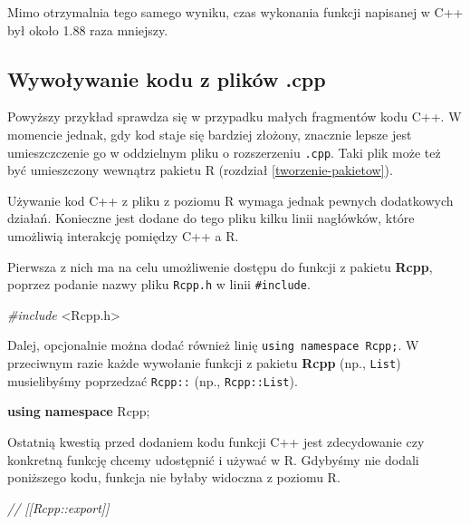 \documentclass[paper=6in:9in,pagesize=pdftex,headinclude=on,footinclude=on,10pt]{scrbook}
\newenvironment{Shaded}{\begin{snugshade}}{\end{snugshade}}
\newcommand{\CommentTok}[1]{\textcolor[rgb]{0.56,0.35,0.01}{\textit{#1}}}
\newcommand{\ImportTok}[1]{#1}
\newcommand{\KeywordTok}[1]{\textcolor[rgb]{0.13,0.29,0.53}{\textbf{#1}}}
\newcommand{\NormalTok}[1]{#1}
\newcommand{\PreprocessorTok}[1]{\textcolor[rgb]{0.56,0.35,0.01}{\textit{#1}}}
\begin{document}
Mimo otrzymalnia tego samego wyniku, czas wykonania funkcji napisanej w C++ był około 1.88 raza mniejszy.

\hypertarget{sourceCpp}{%
\subsection{Wywoływanie kodu z plików .cpp}\label{sourceCpp}}

Powyższy przykład sprawdza się w przypadku małych fragmentów kodu C++.
W momencie jednak, gdy kod staje się bardziej złożony, znacznie lepsze jest umieszczczenie go w oddzielnym pliku o rozszerzeniu \texttt{.cpp}.
Taki plik może też być umieszczony wewnątrz pakietu R (rozdział \ref{tworzenie-pakietow}).

Używanie kod C++ z pliku z poziomu R wymaga jednak pewnych dodatkowych działań.
Konieczne jest dodane do tego pliku kilku linii nagłówków, które umożliwią interakcję pomiędzy C++ a R.

Pierwsza z nich ma na celu umożliwenie dostępu do funkcji z pakietu \textbf{Rcpp}, poprzez podanie nazwy pliku \texttt{Rcpp.h} w linii \texttt{\#include}.

\begin{Shaded}
\begin{Highlighting}[]
\PreprocessorTok{#include }\ImportTok{<Rcpp.h>}
\end{Highlighting}
\end{Shaded}

Dalej, opcjonalnie można dodać również linię \texttt{using\ namespace\ Rcpp;}.
W przeciwnym razie każde wywołanie funkcji z pakietu \textbf{Rcpp} (np., \texttt{List}) musielibyśmy poprzedzać \texttt{Rcpp::} (np., \texttt{Rcpp::List}).

\begin{Shaded}
\begin{Highlighting}[]
\KeywordTok{using} \KeywordTok{namespace}\NormalTok{ Rcpp;}
\end{Highlighting}
\end{Shaded}

Ostatnią kwestią przed dodaniem kodu funkcji C++ jest zdecydowanie czy konkretną funkcję chcemy udostępnić i używać w R.
Gdybyśmy nie dodali poniższego kodu, funkcja nie byłaby widoczna z poziomu R.

\begin{Shaded}
\begin{Highlighting}[]
\CommentTok{// [[Rcpp::export]]}
\end{Highlighting}
\end{Shaded}
\end{document}
